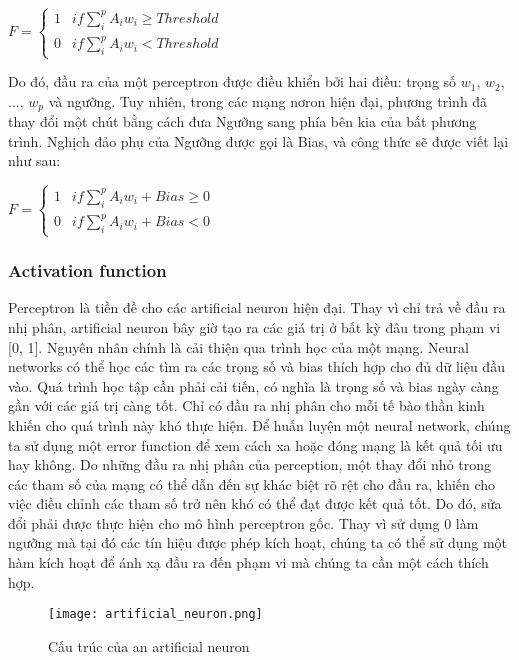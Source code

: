 \begin{center}
$F = \begin{cases}
1 & if \sum_{i}^{p} A_i w_i \geq Threshold \\
0 & if \sum_{i}^{p} A_i w_i < Threshold
\end{cases}$
\end{center}

Do đó, đầu ra của một perceptron được điều khiển bởi hai điều: trọng số $w_1$, $w_2$, ..., $w_p$ và ngưỡng. 
Tuy nhiên, trong các mạng nơron hiện đại, phương trình đã thay đổi một chút bằng cách đưa Ngưỡng sang phía bên kia của bất phương trình.
Nghịch đảo phụ của Ngưỡng được gọi là Bias, và công thức sẽ được viết lại như sau:

\begin{center}
$F = \begin{cases}
1 & if \sum_{i}^{p} A_i w_i + Bias \geq 0 \\
0 & if \sum_{i}^{p} A_i w_i + Bias < 0
\end{cases}$
\end{center}

\subsubsection{Activation function}

Perceptron là tiền đề cho các artificial neuron hiện đại.
Thay vì chỉ trả về đầu ra nhị phân, artificial neuron bây giờ tạo ra các giá trị ở bất kỳ đâu trong phạm vi [0, 1].
Nguyên nhân chính là cải thiện qua trình học của một mạng.
Neural networks có thể học các tìm ra các trọng số và bias thích hợp cho đủ dữ liệu đầu vào. 
Quá trình học tập cần phải cải tiến, có nghĩa là trọng số và bias ngày càng gần với các giá trị càng tốt.
Chỉ có đầu ra nhị phân cho mỗi tế bào thần kinh khiến cho quá trình này khó thực hiện.
Để huấn luyện một neural network, chúng ta sử dụng một error function để xem cách xa hoặc đóng mạng là kết quả tối ưu hay không.
Do những đầu ra nhị phân của perception, một thay đổi nhỏ trong các tham số của mạng có thể dẫn đến sự khác biệt rõ rệt cho đầu ra, khiến cho việc điều chỉnh các tham số trở nên khó có thể đạt được kết quả tốt.
Do đó, sửa đổi phải được thực hiện cho mô hình perceptron gốc. 
Thay vì sử dụng 0 làm ngưỡng mà tại đó các tín hiệu được phép kích hoạt, chúng ta có thể sử dụng một hàm kích hoạt để ánh xạ đầu ra đến phạm vi mà chúng ta cần một cách thích hợp.

\begin{figure}[H]
\centering    
\texttt{[image: artificial\_neuron.png]}
\caption{Cấu trúc của an artificial neuron \cite{wikian}}
\label{fig:artificial-neuron}
\end{figure}

